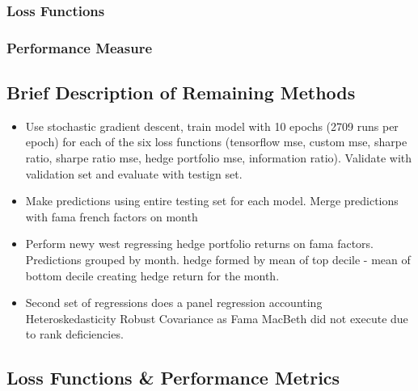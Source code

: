 \documentclass[12pt]{article}
\begin{document}
\subsubsection{Loss Functions}
\subsubsection{Performance Measure}
\subsection{Brief Description of Remaining Methods}
\begin{itemize}
	\item Use stochastic gradient descent, train model with 10 epochs (2709 runs per epoch) for each of the six loss functions (tensorflow mse, custom mse, sharpe ratio, sharpe ratio mse, hedge portfolio mse, information ratio). Validate with validation set and evaluate with testign set.
	\item Make predictions using entire testing set for each model. Merge predictions with fama french factors on month
	\item Perform newy west regressing hedge portfolio returns on fama factors. Predictions grouped by month. hedge formed by mean of top decile - mean of bottom decile creating hedge return for the month.
	\item Second set of regressions does a panel regression  accounting Heteroskedasticity Robust Covariance as Fama MacBeth did not execute due to rank deficiencies.
\end{itemize}
\subsection{Loss Functions \& Performance Metrics}
\end{document}
